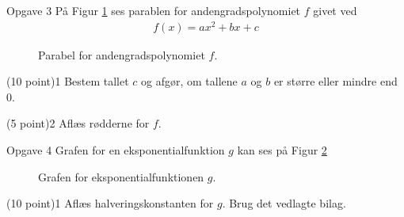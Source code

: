 \begin{opgavetekst}{Opgave 3}
	På Figur \ref{fig:parabel} ses parablen for andengradspolynomiet $f$ givet ved
	\begin{align*}
		f(x) = ax^2+bx+c
	\end{align*}
	
	\begin{figure}[H]
		\centering
		\caption{Parabel for andengradspolynomiet $f$.}
		\label{fig:parabel}
	\end{figure}
	\phantom{h}
\end{opgavetekst}
\begin{delopgave}{(10 point)}{1}
	Bestem tallet $c$ og afgør, om tallene $a$ og $b$ er større eller mindre end $0$.
\end{delopgave}
\begin{delopgave}{(5 point)}{2}
	Aflæs rødderne for $f$. 
\end{delopgave}


	

\newpage

\begin{opgavetekst}{Opgave 4}
	Grafen for en eksponentialfunktion $g$ kan ses på Figur \ref{fig:exp}
	\begin{figure}[H]
		\centering
		\caption{Grafen for eksponentialfunktionen $g$.}
		\label{fig:exp}
	\end{figure}
	\phantom{h}
\end{opgavetekst}
\begin{delopgave}{(10 point)}{1}
	Aflæs halveringskonstanten for $g$. Brug det vedlagte bilag. 
\end{delopgave}

